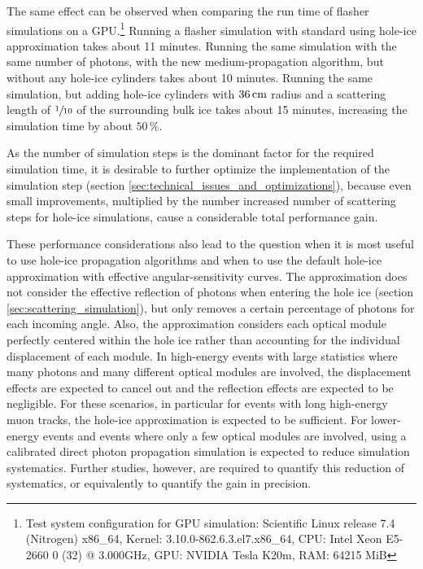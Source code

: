 The same effect can be observed when comparing the run time of flasher
simulations on a
GPU.\footnote{Test system configuration for GPU simulation: Scientific Linux release 7.4 (Nitrogen) x86\_64, Kernel: 3.10.0-862.6.3.el7.x86\_64, CPU: Intel Xeon E5-2660 0 (32) @ 3.000GHz, GPU: NVIDIA Tesla K20m, RAM: 64215 MiB}
Running a flasher simulation with standard \clsim using hole-ice
approximation takes about 11 minutes. Running the same simulation with
the same number of photons, with the new medium-propagation algorithm,
but without any hole-ice cylinders takes about 10 minutes. Running the
same simulation, but adding hole-ice cylinders with \(36\text{\,cm}\) radius and
a scattering length of \(\sfrac{1}{10}\) of the surrounding bulk ice
takes about 15 minutes, increasing the simulation time by about
\(50\,\%\).

As the number of simulation steps is the dominant factor for the
required simulation time, it is desirable to further optimize the
implementation of the simulation step (section
\ref{sec:technical_issues_and_optimizations}), because even small
improvements, multiplied by the number increased number of scattering
steps for hole-ice simulations, cause a considerable total performance
gain.\followup

These performance considerations also lead to the question when it is
most useful to use hole-ice propagation algorithms and when to use the
default hole-ice approximation with effective angular-sensitivity
curves. The approximation does not consider the effective reflection of
photons when entering the hole ice (section
\ref{sec:scattering_simulation}), but only removes a certain percentage
of photons for each incoming angle. Also, the approximation considers
each optical module perfectly centered within the hole ice rather than
accounting for the individual displacement of each module. In
high-energy events with large statistics where many photons and many
different optical modules are involved, the displacement effects are
expected to cancel out and the reflection effects are expected to be
negligible. For these scenarios, in particular for events with long
high-energy muon tracks, the hole-ice approximation is expected to be
sufficient. For lower-energy events and events where only a few optical
modules are involved, using a calibrated direct photon propagation
simulation is expected to reduce simulation systematics. Further
studies, however, are required to quantify this reduction of
systematics, or equivalently to quantify the gain in precision.\followup
